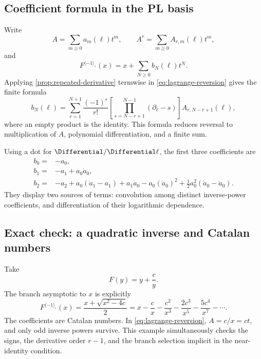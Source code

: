 \documentclass[11pt,oneside]{article}
\numberwithin{equation}{section}
\theoremstyle{definition}
\newcommand{\dlog}{\partial_{\ell}}
\newcommand{\rev}{\langle-1\rangle_{\circ}}
\begin{document}
\subsection{Coefficient formula in the PL basis}

Write
\begin{equation}\label{eq:A-power-coefficients}
 A=\sum_{m\ge0}a_m(\ell)t^m,
 \qquad
 A^r=\sum_{m\ge0}A_{r,m}(\ell)t^m,
\end{equation}
and
\[
 F^{\rev}(x)=x+\sum_{N\ge0}b_N(\ell)t^N.
\]
Applying \cref{prop:repeated-derivative} termwise in
\eqref{eq:lagrange-reversion} gives the finite formula
\begin{equation}\label{eq:inverse-coefficient-formula}
\boxed{
 b_N(\ell)=
 \sum_{r=1}^{N+1}\frac{(-1)^r}{r!}
 \left[\prod_{s=N-r+1}^{N-1}(\dlog-s)\right]
 A_{r,N-r+1}(\ell),
}
\end{equation}
where an empty product is the identity.  This formula reduces reversal to
multiplication of \(A\), polynomial differentiation, and a finite sum.

Using a dot for \(\Differential/\Differential\ell\), the first three coefficients are
\begin{align}
 b_0={}&-a_0,\label{eq:b0}\\
 b_1={}&-a_1+a_0\dot a_0,\label{eq:b1}\\
 b_2={}&-a_2+a_0(\dot a_1-a_1)+a_1\dot a_0
       -a_0(\dot a_0)^2
       +\frac12a_0^2(\dot a_0-\ddot a_0).
       \label{eq:b2}
\end{align}
They display two sources of terms: convolution among distinct inverse-power
coefficients, and differentiation of their logarithmic dependence.

\subsection{Exact check: a quadratic inverse and Catalan numbers}

Take
\[
  F(y)=y+\frac{c}{y}.
\]
The branch asymptotic to \(x\) is explicitly
\begin{equation}\label{eq:quadratic-exact-inverse}
  F^{\rev}(x)=\frac{x+\sqrt{x^2-4c}}2
  =x-\frac{c}{x}-\frac{c^2}{x^3}
    -\frac{2c^3}{x^5}-\frac{5c^4}{x^7}-\cdots.
\end{equation}
The coefficients are Catalan numbers.  In
\eqref{eq:lagrange-reversion}, \(A=c/x=ct\), and only odd inverse powers survive.
This example simultaneously checks the signs, the derivative order \(r-1\), and
the branch selection implicit in the near-identity condition.
\end{document}
